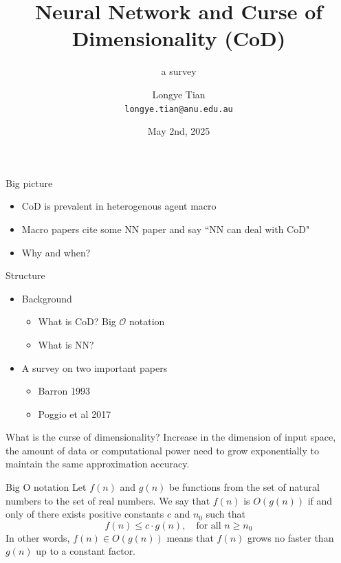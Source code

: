 \documentclass[aspectratio=169]{beamer} %
\title[NN]{Neural Network and Curse of Dimensionality (CoD)}
\subtitle{a survey}
\author[Longye]{Longye Tian \\ \texttt{longye.tian@anu.edu.au}}
\institute[ANU]{Australian National University\\ School of Economics}
\date{May 2nd, 2025}
\begin{document}
\begin{frame}
  \titlepage
\end{frame}

\begin{frame}{Big picture}
\begin{itemize}
    \item CoD is prevalent in heterogenous agent macro
    \item Macro papers cite some NN paper and say ``NN can deal with CoD"
    \item Why and when?
\end{itemize}

\end{frame}

\begin{frame}{Structure}
\begin{itemize}
    \item Background
    \begin{itemize}
        \item What is CoD? Big $\mathcal{O}$ notation
        \item What is NN?
    \end{itemize}
    \item A survey on two important papers
    \begin{itemize}
        \item Barron 1993
        \item Poggio et al 2017
    \end{itemize}
\end{itemize}
    
\end{frame}

\begin{frame}{What is the curse of dimensionality?}
    Increase in the dimension of input space, the amount of data or computational power need to grow exponentially to maintain the same approximation accuracy. 
\end{frame}

\begin{frame}{Big O notation}
Let $f(n)$ and $g(n)$ be functions from the set of natural numbers to the set of real numbers. We say that $f(n)$ is $O(g(n))$ if and only of there exists positive constants $c$ and $n_0$ such that
$$
f(n) \le c\cdot g(n),\quad\text{for all $n\ge n_0$}
$$
In other words, $f(n) \in O(g(n))$ means that $f(n)$ grows no faster than $g(n)$ up to a constant factor. 
\end{frame}
\end{document}
